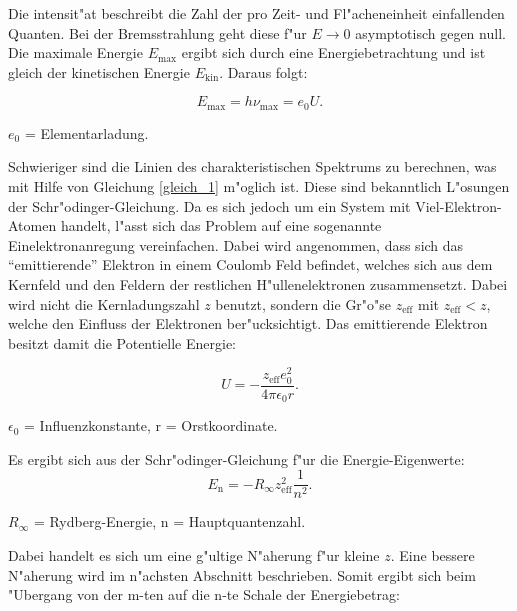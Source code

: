 		Die intensit"at beschreibt die Zahl der pro Zeit- und Fl"acheneinheit einfallenden Quanten.
		Bei der Bremsstrahlung geht diese f"ur $E \rightarrow 0$ asymptotisch gegen null. Die maximale Energie $E_\mathrm{max}$ ergibt sich durch eine Energiebetrachtung und ist gleich der kinetischen Energie $E_\mathrm{kin}$.
		Daraus folgt:

		\begin{equation}
			E_\mathrm{max} = h\nu_\mathrm{max} = e_\mathrm{0}U. \label{gleich_2}
		\end{equation}
		\begin{center}
			$e_\mathrm{0}$ = Elementarladung.
		\end{center}

		Schwieriger sind die Linien des charakteristischen Spektrums zu berechnen, was mit Hilfe von Gleichung \eqref{gleich_1} m"oglich ist.
		Diese sind bekanntlich L"osungen der Schr"odinger-Gleichung. 
		Da es sich jedoch um ein System mit Viel-Elektron-Atomen handelt, l"asst sich das Problem auf eine sogenannte Einelektronanregung vereinfachen.
		Dabei wird angenommen, dass sich das "`emittierende"' Elektron in einem Coulomb Feld befindet, welches sich aus dem Kernfeld und den Feldern der restlichen H"ullenelektronen zusammensetzt.
		Dabei wird nicht die Kernladungszahl $z$ benutzt, sondern die Gr"o"se $z_\mathrm{eff}$ mit $z_\mathrm{eff} < z$, welche den Einfluss der Elektronen ber"ucksichtigt.
		Das emittierende Elektron besitzt damit die Potentielle Energie:

		\begin{equation}
			U = -\frac{z_\mathrm{eff} e_\mathrm{0}^2}{4 \pi \epsilon_\mathrm{0} r}. \label{gleich_3}
		\end{equation}
		\begin{center}
			$\epsilon_\mathrm{0}$ = Influenzkonstante, r = Orstkoordinate.
		\end{center}

		Es ergibt sich aus der Schr"odinger-Gleichung f"ur die Energie-Eigenwerte: 		
		\begin{equation}
			E_\mathrm{n} = - R_\infty z_\mathrm{eff}^2 \frac{1}{n^2}. \label{gleich_4}
		\end{equation}
		\begin{center}
			$R_\infty$ = Rydberg-Energie, n = Hauptquantenzahl.
		\end{center}

		Dabei handelt es sich um eine g"ultige N"aherung f"ur kleine $z$.
		Eine bessere N"aherung wird im n"achsten Abschnitt beschrieben.
		Somit ergibt sich beim "Ubergang von der m-ten auf die n-te Schale der Energiebetrag:

